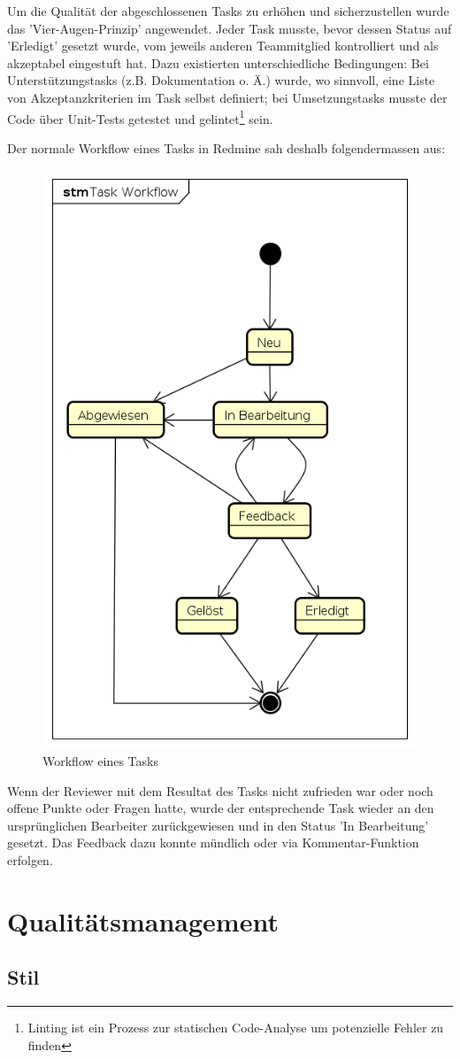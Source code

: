 Um die Qualität der abgeschlossenen Tasks zu erhöhen und sicherzustellen wurde das 'Vier-Augen-Prinzip' angewendet. Jeder Task musste, bevor dessen Status auf 'Erledigt' gesetzt wurde, vom jeweils anderen Teammitglied kontrolliert und als akzeptabel eingestuft hat. Dazu existierten unterschiedliche Bedingungen: Bei Unterstützungstasks (z.B. Dokumentation o. Ä.) wurde, wo sinnvoll, eine Liste von Akzeptanzkriterien im Task selbst definiert; bei Umsetzungstasks musste der Code über Unit-Tests getestet und gelintet\footnote{Linting ist ein Prozess zur statischen Code-Analyse um potenzielle Fehler zu finden} sein.

Der normale Workflow eines Tasks in Redmine sah deshalb folgendermassen aus:

\begin{figure}[H]
	\centering
	\includegraphics[width=0.5\linewidth]{fig/task_workflow}
	\caption{Workflow eines Tasks}
	\label{fig:pm:workflow}
\end{figure}

Wenn der Reviewer mit dem Resultat des Tasks nicht zufrieden war oder noch offene Punkte oder Fragen hatte, wurde der entsprechende Task wieder an den ursprünglichen Bearbeiter zurückgewiesen und in den Status 'In Bearbeitung' gesetzt. Das Feedback dazu konnte mündlich oder via Kommentar-Funktion erfolgen.

\section{Qualitätsmanagement}

\subsection*{Stil}

